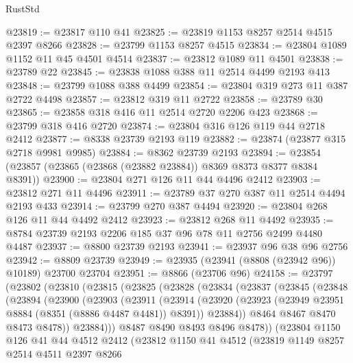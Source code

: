\begin{lexlean}{RustStd}
\begin{coremodule}
@23819 := @23817 @110 @41
@23825 := @23819 @1153 @8257 @2514 @4515 @2397 @8266
@23828 := @23799 @1153 @8257 @4515
@23834 := @23804 @1089 @1152 @11 @45 @4501 @4514
@23837 := @23812 @1089 @11 @4501
@23838 := @23789 @22
@23845 := @23838 @1088 @388 @11 @2514 @4499 @2193 @413
@23848 := @23799 @1088 @388 @4499
@23854 := @23804 @319 @273 @11 @387 @2722 @4498
@23857 := @23812 @319 @11 @2722
@23858 := @23789 @30
@23865 := @23858 @318 @416 @11 @2514 @2720 @2206 @423
@23868 := @23799 @318 @416 @2720
@23874 := @23804 @316 @126 @119 @44 @2718 @2412
@23877 := @8338 @23739 @2193 @119
@23882 := @23874 (@23877 @315 @2718 @9981 @9985)
@23884 := @8362 @23739 @2193
@23894 := @23854 (@23857 (@23865 (@23868 (@23882 @23884)) @8369 @8373 @8377 @8384 @8391))
@23900 := @23804 @271 @126 @11 @44 @4496 @2412
@23903 := @23812 @271 @11 @4496
@23911 := @23789 @37 @270 @387 @11 @2514 @4494 @2193 @433
@23914 := @23799 @270 @387 @4494
@23920 := @23804 @268 @126 @11 @44 @4492 @2412
@23923 := @23812 @268 @11 @4492
@23935 := @8784 @23739 @2193 @2206 @185 @37 @96 @78 @11 @2756 @2499 @4480 @4487
@23937 := @8800 @23739 @2193
@23941 := @23937 @96 @38 @96 @2756
@23942 := @8809 @23739
@23949 := @23935 (@23941 (@8808 (@23942 @96)) @10189) @23700 @23704
@23951 := @8866 (@23706 @96)
@24158 := @23797
    (@23802
      (@23810
        (@23815
          (@23825
            (@23828
              (@23834
                (@23837
                  (@23845
                    (@23848
                      (@23894
                        (@23900
                          (@23903
                            (@23911
                              (@23914
                                (@23920
                                  (@23923 (@23949 @23951 @8884 (@8351 (@8886 @4487 @4481)) @8391))
                                  @23884))
                              @8464
                              @8467
                              @8470
                              @8473
                              @8478))
                          @23884)))
                    @8487
                    @8490
                    @8493
                    @8496
                    @8478))
                (@23804
                  @1150
                  @126
                  @41
                  @44
                  @4512
                  @2412
                  (@23812
                    @1150
                    @41
                    @4512
                    (@23819
                      @1149
                      @8257
                      @2514
                      @4511
                      @2397
                      @8266

\end{coremodule}
\end{lexlean}
